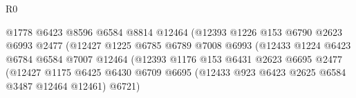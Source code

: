 \begin{lexlean}{R0}
\begin{coremodule}
                                          @1778
                                          @6423
                                          @8596
                                          @6584
                                          @8814
                                          @12464
                                          (@12393
                                            @1226
                                            @153
                                            @6790
                                            @2623
                                            @6993
                                            @2477
                                            (@12427
                                              @1225
                                              @6785
                                              @6789
                                              @7008
                                              @6993
                                              (@12433
                                                @1224
                                                @6423
                                                @6784
                                                @6584
                                                @7007
                                                @12464
                                                (@12393
                                                  @1176
                                                  @153
                                                  @6431
                                                  @2623
                                                  @6695
                                                  @2477
                                                  (@12427
                                                    @1175
                                                    @6425
                                                    @6430
                                                    @6709
                                                    @6695
                                                    (@12433
                                                      @923
                                                      @6423
                                                      @2625
                                                      @6584
                                                      @3487
                                                      @12464
                                                      @12461)
                                                    @6721)

\end{coremodule}
\end{lexlean}
